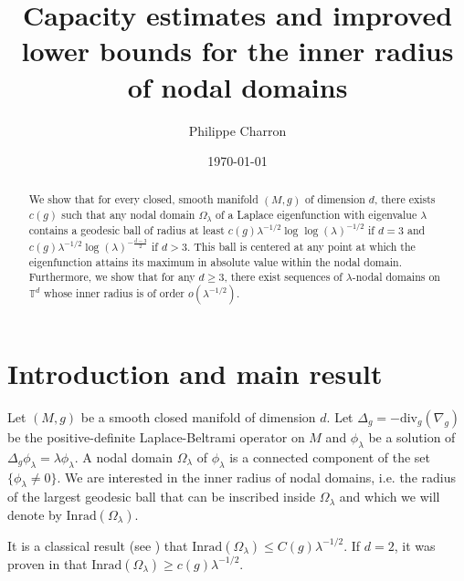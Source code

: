 \documentclass{amsart}
\begin{document}
\title{Capacity estimates and improved lower bounds for the inner radius of nodal domains}
\author{Philippe Charron}
\address{Department of Mathematics, University College London, Gower Street, London, WC1E 6BT, UK}
\date{\today}


\begin{abstract}
    We show that for every closed, smooth manifold $(M,g)$ of dimension $d$, there exists $c(g)$ such that any nodal domain $\Omega_\lambda$ of a Laplace eigenfunction with eigenvalue $\lambda$ contains a geodesic ball of radius at least $c(g) \lambda^{-1/2} \log\log(\lambda)^{-1/2}$ if $d=3$ and $c(g) \lambda^{-1/2} \log(\lambda)^{-\frac{d-3}{2}}$ if $d >3$. This ball is centered at any point at which the eigenfunction attains its maximum in absolute value within the nodal domain. Furthermore, we show that for any $d \geq 3$, there exist sequences of $\lambda$-nodal domains on $\mathbb{T}^d$  whose inner radius is of order $o(\lambda^{-1/2})$.
\end{abstract}



\maketitle



\section{Introduction and main result}


Let $(M,g)$ be a smooth closed manifold of dimension $d$. Let $\Delta_g = -\text{div}_g(\nabla_g)$ be the positive-definite Laplace-Beltrami operator on $M$ and $\phi_\lambda$ be a solution of $\Delta_g \phi_\lambda = \lambda \phi_\lambda$. A nodal domain $\Omega_\lambda$ of $\phi_\lambda$ is a connected component of the set $\{ \phi_\lambda \neq 0 \}$. We are interested in the inner radius of nodal domains, i.e.  the radius of the largest geodesic ball that can be inscribed inside $\Omega_\lambda$ and which we will denote by $\text{Inrad}(\Omega_\lambda)$.

It is a classical result (see \cites{berard-meyer, bruning78}) that $\text{Inrad}(\Omega_\lambda) \leq C(g) \lambda^{-1/2}$. If $d=2$, it was proven in \cite{mang-inrad} that $\text{Inrad}(\Omega_\lambda) \geq c(g) \lambda^{-1/2}$. 
\end{document}
